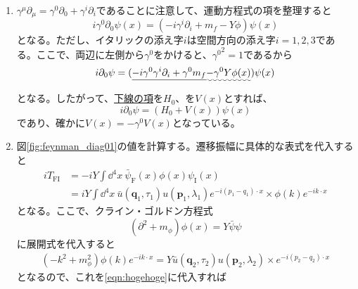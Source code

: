 \documentclass[unicode,a4paper,10pt]{ltjsarticle}
\begin{document}
\begin{enumerate}
  \item
        $\gamma^{\mu}\partial_{\mu}=\gamma^{0}\partial_{0}+\gamma^{i}\partial_{i}$であることに注意して、運動方程式の項を整理すると
        \begin{equation}
          i\gamma^{0}\partial_{0}\psi(x)
          =
          (-i\gamma^{i}\partial_{i}+m_{f}-Y\phi)\psi(x)
        \end{equation}
        となる。ただし、イタリックの添え字$i$は空間方向の添え字$i=1,2,3$である。ここで、両辺に左側から$\gamma^{0}$をかけると、${\gamma^{0}}^2=1$であるから
        \begin{equation}
          i\partial_{0}\psi
          =
          (
          \uline{-i\gamma^{0}\gamma^{i}\partial_{i}
          +
          \gamma^{0}m_{f}
          }
          \uwave{
            -
            \gamma^{0}Y\phi(x)
          }
          )\psi(x)
        \end{equation}
        となる。したがって、\uline{下線の項}を$H_{0}$、を$V(x)$とすれば、
        \begin{equation}
          i\partial_{0}\psi
          =
          (
          H_{0}
          +
          V(x)
          )\psi(x)
        \end{equation}
        であり、確かに$V(x)=-\gamma^{0}V(x)$となっている。


  \item
        図\ref{fig:feynman_diag01}の値を計算する。遷移振幅に具体的な表式を代入すると
        \begin{align}
          iT_{\textrm{FI}}
           & =
          -iY
          \int\dd^4 x\
          \bar{\psi}_{\textrm{F}}(x)\phi(x)\psi_{\textrm{I}}(x)
          \nonumber
          \\
           & =
          iY
          \int\dd^4 x\
          \bar{u}(\bm{q}_{1},\tau_{1})u(\bm{p}_{1},\lambda_{1})e^{-i(p_{1}-q_{1})\cdot x}
          \times
          \phi(k)e^{-ik\cdot x}
          \label{eqn:hogehoge}
        \end{align}
        となる。ここで、クライン・ゴルドン方程式
        \begin{equation}
          (\partial^2+m_{\phi})\phi(x)
          =
          Y\bar{\psi}\psi
        \end{equation}
        に展開式を代入すると
        \begin{gather}
          (-k^2+m_{\phi}^2)\phi(k)e^{-ik\cdot x}
          =
          Y\bar{u}(\bm{q}_{2},\tau_{2})u(\bm{p}_{2},\lambda_{2})
          \times
          e^{-i(p_{2}-q_{2})\cdot x}
        \end{gather}
        となるので、これを\eqref{eqn:hogehoge}に代入すれば
        \begin{graybox}


\end{graybox}
\end{enumerate}
\end{document}
